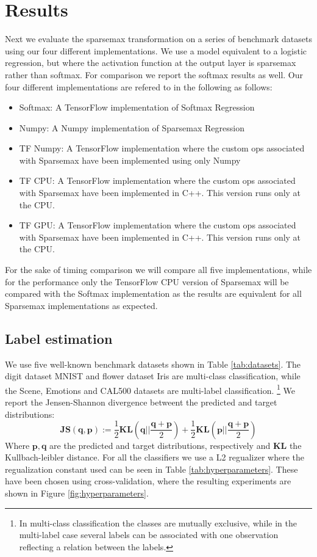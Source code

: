 \section{Results}
Next we evaluate the sparsemax transformation on a series of benchmark datasets using our four different implementations. We use a  model equivalent to a logistic regression, but where the activation function at the output layer is sparsemax rather than softmax. For comparison we report the softmax results as well. Our four different implementations are refered to in the following as follows:
\begin{itemize}
\item Softmax: A TensorFlow implementation of Softmax Regression
\item Numpy: A Numpy implementation of Sparsemax Regression
\item TF Numpy: A TensorFlow implementation where the custom ops associated with Sparsemax have been implemented using only Numpy
\item TF CPU: A TensorFlow implementation where the custom ops associated with Sparsemax have been implemented in C++. This version runs only at the CPU.
\item TF GPU: A TensorFlow implementation where the custom ops associated with Sparsemax have been implemented in C++. This version runs only at the CPU.
\end{itemize}
For the sake of timing comparison we will compare all five implementations, while for the performance only the TensorFlow CPU version of Sparsemax will be compared with the Softmax implementation as the results are equivalent for all Sparsemax implementations as expected.
\subsection{Label estimation}
We use five well-known benchmark datasets shown in Table \ref{tab:datasets}. The digit dataset MNIST and flower dataset Iris are multi-class classification, while the Scene, Emotions and CAL500 datasets are multi-label classification. \footnote{In multi-class classification the classes are mutually exclusive, while in the multi-label case several labels can be associated with one observation reflecting a relation between the labels.} We report the Jensen-Shannon divergence betweent the predicted and target distributions:
\begin{equation}
\mathbf{JS(q,p)}:=\frac{1}{2}\mathbf{KL}(\mathbf{q}||\frac{\mathbf{q}+\mathbf{p}}{2})+\frac{1}{2}\mathbf{KL}(\mathbf{p}||\frac{\mathbf{q}+\mathbf{p}}{2})
\end{equation}
Where $\mathbf{p}, \mathbf{q}$ are the predicted and target distributions, respectively and $\mathbf{KL}$ the Kullbach-leibler distance. For all the classifiers we use a L2 regualizer where the regualization constant used can be seen in Table \ref{tab:hyperparameters}. These have been chosen using cross-validation, where the resulting experiments are shown in Figure \ref{fig:hyperparameters}.

